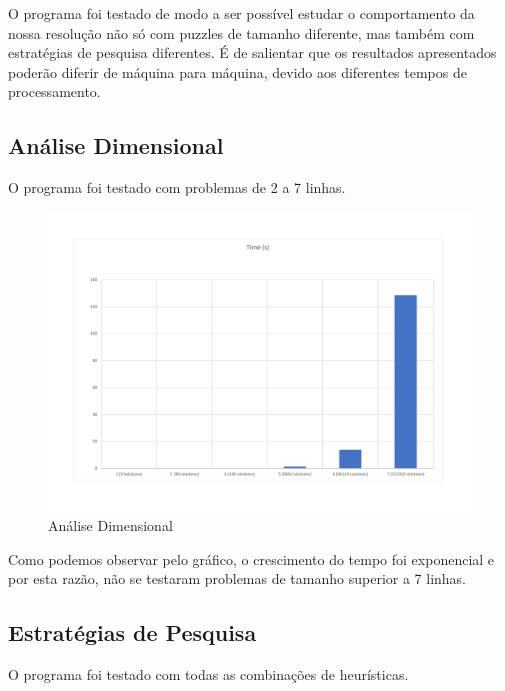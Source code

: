 O programa foi testado de modo a ser possível estudar o comportamento da nossa resolução não só com puzzles de tamanho diferente, mas também com estratégias de pesquisa diferentes.
É de salientar que os resultados apresentados poderão diferir de máquina para máquina, devido aos diferentes tempos de processamento.

\subsection{Análise Dimensional}
O programa foi testado com problemas de 2 a 7 linhas.

\begin{figure}
    \centering
    \includegraphics{size_graphs.pdf}
    \caption{Análise Dimensional}
    \label{fig: sizegraph}
\end{figure}

Como podemos observar pelo gráfico, o crescimento do tempo foi exponencial e por esta razão, não se testaram problemas de tamanho superior a 7 linhas.

\subsection{Estratégias de Pesquisa}
O programa foi testado com todas as combinações de heurísticas.

